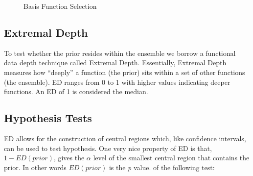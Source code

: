 \documentclass[12pt]{article}
\begin{document}
\begin{figure}[H]
    \hspace{-2.5cm}
    \caption{Basis Function Selection}
    \label{fig:basis}
\end{figure}


\subsection{Extremal Depth}
To test whether the prior resides within the ensemble we borrow a functional data depth technique called Extremal Depth. Essentially, Extremal Depth measures how ``deeply'' a function (the prior) sits within a set of other functions (the ensemble). ED ranges from 0 to 1 with higher values indicating deeper functions. An ED of 1 is considered the median\cite{naveen15}.

\subsection{Hypothesis Tests}
ED allows for the construction of central regions which, like confidence intervals, can be used to test hypothesis. One very nice property of ED is that, $1 - ED(prior)$, gives the $\alpha$ level of the smallest central region that contains the prior. In other words  $ED(prior)$ is the \textit{p} value\cite{naveen15}. of the following test:
\end{document}
